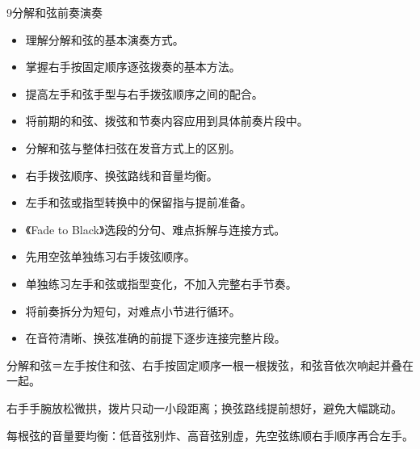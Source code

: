 \begin{lessoncard}{9}{分解和弦前奏演奏}
\begin{itemize}
\item 理解分解和弦的基本演奏方式。
\item 掌握右手按固定顺序逐弦拨奏的基本方法。
\item 提高左手和弦手型与右手拨弦顺序之间的配合。
\item 将前期的和弦、拨弦和节奏内容应用到具体前奏片段中。
\end{itemize}
\begin{itemize}
\item 分解和弦与整体扫弦在发音方式上的区别。
\item 右手拨弦顺序、换弦路线和音量均衡。
\item 左手和弦或指型转换中的保留指与提前准备。
\item 《Fade to Black》选段的分句、难点拆解与连接方式。
\end{itemize}
\begin{itemize}
\item 先用空弦单独练习右手拨弦顺序。
\item 单独练习左手和弦或指型变化，不加入完整右手节奏。
\item 将前奏拆分为短句，对难点小节进行循环。
\item 在音符清晰、换弦准确的前提下逐步连接完整片段。
\end{itemize}
\begin{fignote}
\begin{center}
\end{center}
\begin{fignotes}
\item 分解和弦＝左手按住和弦、右手按固定顺序一根一根拨弦，和弦音依次响起并叠在一起。
\item 右手手腕放松微拱，拨片只动一小段距离；换弦路线提前想好，避免大幅跳动。
\item 每根弦的音量要均衡：低音弦别炸、高音弦别虚，先空弦练顺右手顺序再合左手。
\end{fignotes}
\end{fignote}
\end{lessoncard}

